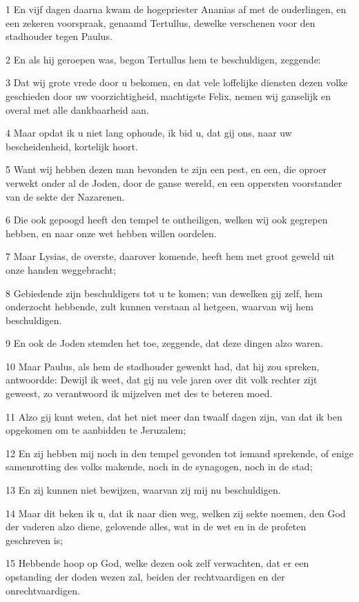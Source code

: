 \par 1 En vijf dagen daarna kwam de hogepriester Ananias af met de ouderlingen, en een zekeren voorspraak, genaamd Tertullus, dewelke verschenen voor den stadhouder tegen Paulus.
\par 2 En als hij geroepen was, begon Tertullus hem te beschuldigen, zeggende:
\par 3 Dat wij grote vrede door u bekomen, en dat vele loffelijke diensten dezen volke geschieden door uw voorzichtigheid, machtigste Felix, nemen wij ganselijk en overal met alle dankbaarheid aan.
\par 4 Maar opdat ik u niet lang ophoude, ik bid u, dat gij ons, naar uw bescheidenheid, kortelijk hoort.
\par 5 Want wij hebben dezen man bevonden te zijn een pest, en een, die oproer verwekt onder al de Joden, door de ganse wereld, en een oppersten voorstander van de sekte der Nazarenen.
\par 6 Die ook gepoogd heeft den tempel te ontheiligen, welken wij ook gegrepen hebben, en naar onze wet hebben willen oordelen.
\par 7 Maar Lysias, de overste, daarover komende, heeft hem met groot geweld uit onze handen weggebracht;
\par 8 Gebiedende zijn beschuldigers tot u te komen; van dewelken gij zelf, hem onderzocht hebbende, zult kunnen verstaan al hetgeen, waarvan wij hem beschuldigen.
\par 9 En ook de Joden stemden het toe, zeggende, dat deze dingen alzo waren.
\par 10 Maar Paulus, als hem de stadhouder gewenkt had, dat hij zou spreken, antwoordde: Dewijl ik weet, dat gij nu vele jaren over dit volk rechter zijt geweest, zo verantwoord ik mijzelven met des te beteren moed.
\par 11 Alzo gij kunt weten, dat het niet meer dan twaalf dagen zijn, van dat ik ben opgekomen om te aanbidden te Jeruzalem;
\par 12 En zij hebben mij noch in den tempel gevonden tot iemand sprekende, of enige samenrotting des volks makende, noch in de synagogen, noch in de stad;
\par 13 En zij kunnen niet bewijzen, waarvan zij mij nu beschuldigen.
\par 14 Maar dit beken ik u, dat ik naar dien weg, welken zij sekte noemen, den God der vaderen alzo diene, gelovende alles, wat in de wet en in de profeten geschreven is;
\par 15 Hebbende hoop op God, welke dezen ook zelf verwachten, dat er een opstanding der doden wezen zal, beiden der rechtvaardigen en der onrechtvaardigen.
